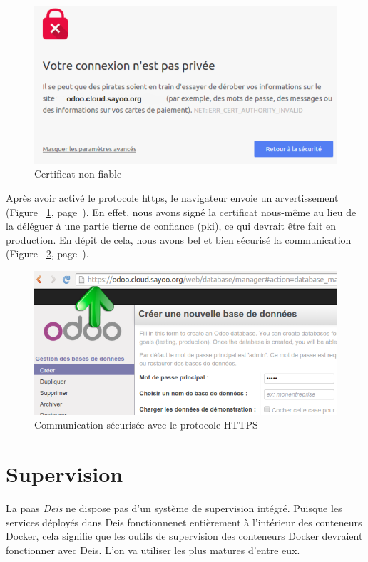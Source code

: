 \begin{onehalfspace}
\begin{figure}[H]
\centering
\includegraphics [scale=0.5]{chapitre5/assets/certificat}
\caption{Certificat non fiable}
\label{fig:certificat}
\end{figure}

Après avoir activé le protocole \acrshort{https}, le navigateur envoie un arvertissement (Figure ~\ref{fig:certificat}, page~\pageref{fig:certificat}). En effet, nous avons signé la certificat nous-même au lieu de la déléguer à une partie tierne de confiance (\acrshort{pki}), ce qui devrait être fait en production. En dépit de cela, nous avons bel et bien sécurisé la communication (Figure ~\ref{fig:https}, page~\pageref{fig:https}).

\begin{figure}[H]
\centering
\includegraphics [scale=0.5]{chapitre5/assets/https}
\caption{Communication sécurisée avec le protocole HTTPS}
\label{fig:https}
\end{figure}


\section{Supervision}

La \acrshort{paas} \emph{Deis} ne dispose pas d'un système de supervision intégré. Puisque les services déployés dans Deis fonctionnenet entièrement à l'intérieur des conteneurs Docker, cela signifie que les outils de supervision des conteneurs Docker devraient fonctionner avec Deis. L'on va utiliser les plus matures d'entre eux.



\end{onehalfspace}
